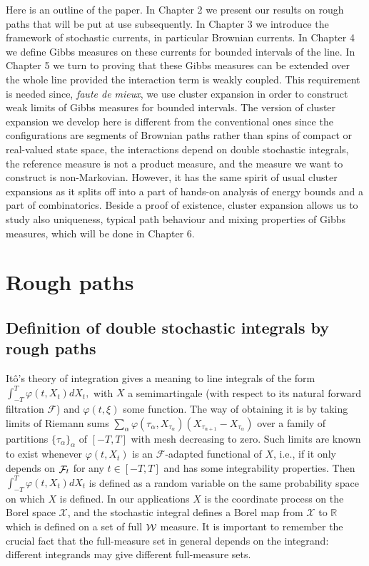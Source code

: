 \documentclass[a4paper,11pt]{article}
\newcommand{\R}{\mathbb{R}}
\newcommand{\F}{\mathop{\mathrm{{\cal F}}}\nolimits}
\newcommand{\W}{\mathop{\mathrm{{\cal W}}}\nolimits}
\newcommand{\X}{\mathcal{X}}
\begin{document}
\medskip
Here is an outline of the paper. In Chapter 2 
we present our results on rough paths that will be put at use 
subsequently. In Chapter 3 we introduce the framework of stochastic 
currents, in particular Brownian currents. In Chapter 4 we define
Gibbs measures on these currents for bounded intervals of the line. In 
Chapter 5 we turn to proving that these Gibbs measures can be extended 
over the whole line provided the interaction term is weakly coupled. 
This requirement is needed since, \emph{faute de mieux}, we use cluster 
expansion in order to construct weak limits of Gibbs measures for 
bounded intervals. The version of cluster expansion we develop here is 
different from the conventional ones since the configurations are 
segments of Brownian paths rather than spins of compact or real-valued 
state space, the interactions depend on double stochastic integrals, 
the reference measure is not a product measure, and the measure we want 
to construct is non-Markovian. However, it has the same spirit of usual 
cluster expansions as it splits off into a part of hands-on analysis of 
energy bounds and a part of combinatorics. Beside a proof of 
existence, cluster expansion allows us to study also uniqueness, typical
path behaviour and mixing properties of Gibbs measures, which will be
done in Chapter 6. 



\label{sec:gibbs}

\section{Rough paths}
\subsection{Definition of double stochastic integrals by rough paths}
\label{sec:rough-paths}

It\^o's theory of integration gives a meaning to line integrals of the 
form 
$
\int_{-T}^T \varphi(t,X_t) dX_t,
$
with $X$ a semimartingale (with respect to its natural forward
filtration $\mathcal{F}$) and $\varphi(t,\xi)$ some function. The way
of obtaining it is by taking limits of Riemann sums
$
\sum_\alpha \varphi(\tau_\alpha,X_{\tau_\alpha}) 
(X_{\tau_{\alpha+1}}-X_{\tau_\alpha})
$
over a family of partitions $\{\tau_\alpha\}_\alpha$ of $[-T,T]$ with 
mesh decreasing to zero. Such limits are known to exist whenever 
$\varphi(t,X_t)$ is an $\mathcal{F}$-adapted functional of $X$, i.e.,
if it only depends on $\F_t$ for any $t\in[-T,T]$ and has some 
integrability properties. Then 
$
\int_{-T}^T \varphi(t,X_t) dX_t
$
is defined as a random variable on the same probability space on which 
$X$ is defined. In our applications $X$ is the coordinate process on the
Borel space $\X$, and the stochastic integral defines a Borel map from
$\X$ to $\R$ which is defined on a set of full $\W$ measure.
It is important to remember the crucial fact that the full-measure set 
in general depends on the integrand: different integrands may give 
different full-measure sets.
\end{document}
